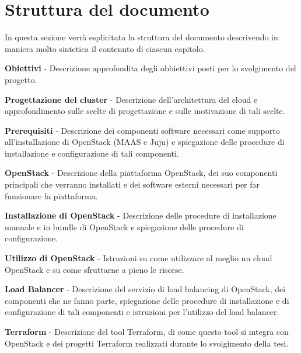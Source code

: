 \section{Struttura del documento}

In questa sezione verrà esplicitata la struttura del documento descrivendo in maniera molto sintetica il contenuto di ciascun capitolo.

\begin{description}
    \item \textbf{Obiettivi} - Descrizione approfondita degli obbiettivi posti per lo svolgimento del progetto.
    \item \textbf{Progettazione del cluster} - Descrizione dell'architettura del cloud e approfondimento sulle scelte di progettazione e sulle motivazione di tali scelte.
    \item \textbf{Prerequisiti} - Descrizione dei componenti software necessari come supporto all'installazione di OpenStack (MAAS e Juju) e spiegazione delle procedure di installazione e configurazione di tali componenti.
    \item \textbf{OpenStack} - Descrizione della piattaforma OpenStack, dei suo componenti principali che verranno installati e dei software esterni necessari per far funzionare la piattaforma.
    \item \textbf{Installazione di OpenStack} - Descrizione delle procedure di installazione manuale e in bundle di OpenStack e spiegazione delle procedure di configurazione.
    \item \textbf{Utilizzo di OpenStack} - Istruzioni su come utilizzare al meglio un cloud OpenStack e su come sfruttarne a pieno le risorse.
    \item \textbf{Load Balancer} - Descrizione del servizio di load balancing di OpenStack, dei componenti che ne fanno parte, spiegazione delle procedure di installazione e di configurazione di tali componenti e istruzioni per l'utilizzo del load balancer.
    \item \textbf{Terraform} - Descrizione del tool Terraform, di come questo tool si integra con OpenStack e dei progetti Terraform realizzati durante lo svolgimento della tesi.
\end{description}
